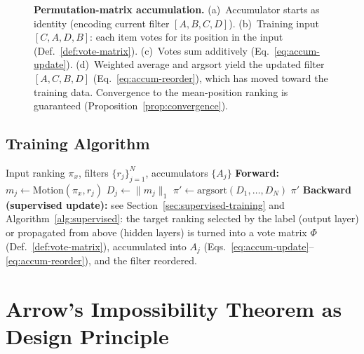 \documentclass[12pt]{article}
\newcommand{\argsort}{\mathrm{argsort}}
\begin{document}
\begin{figure}[t]
{\begin{tikzpicture}[
    >=Stealth,
    arr/.style={->, thick},
    lbl/.style={font=\small},
    cell/.style={draw, minimum width=0.7cm, minimum height=0.7cm, font=\small, inner sep=0pt},
]
\end{tikzpicture}%
}
\caption{\textbf{Permutation-matrix accumulation.} (a)~Accumulator starts as identity (encoding current filter $[A,B,C,D]$). (b)~Training input $[C,A,D,B]$: each item votes for its position in the input (Def.~\ref{def:vote-matrix}). (c)~Votes sum additively (Eq.~\ref{eq:accum-update}). (d)~Weighted average and argsort yield the updated filter $[A,C,B,D]$ (Eq.~\ref{eq:accum-reorder}), which has moved toward the training data. Convergence to the mean-position ranking is guaranteed (Proposition~\ref{prop:convergence}).}
\label{fig:accumulation}
\end{figure}

\subsection{Training Algorithm}

\begin{algorithm}[t]
\caption{Ranking Layer Forward--Backward}
\label{alg:rank-layer}
\begin{algorithmic}[1]
\Require Input ranking $\pi_x$, filters $\{r_j\}_{j=1}^N$, accumulators $\{A_j\}$
\Statex
\State \textbf{Forward:}
  \State $m_j \gets \mathrm{Motion}(\pi_x, r_j)$ 
  \State $D_j \gets \|m_j\|_1$ 
\EndFor
\State $\pi' \gets \argsort(D_1, \dots, D_N)$ 
\State \Return $\pi'$
\Statex
\State \textbf{Backward (supervised update):} see Section~\ref{sec:supervised-training} and Algorithm~\ref{alg:supervised}: the target ranking selected by the label (output layer) or propagated from above (hidden layers) is turned into a vote matrix $\Phi$ (Def.~\ref{def:vote-matrix}), accumulated into $A_j$ (Eqs.~\ref{eq:accum-update}--\ref{eq:accum-reorder}), and the filter reordered.
\end{algorithmic}
\end{algorithm}


\section{Arrow's Impossibility Theorem as Design Principle}
\label{sec:arrow}
\end{document}
